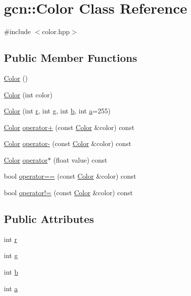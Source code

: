 \hypertarget{classgcn_1_1Color}{}\section{gcn\+:\+:Color Class Reference}
\label{classgcn_1_1Color}


{\ttfamily \#include $<$color.\+hpp$>$}

\subsection*{Public Member Functions}
\begin{DoxyCompactItemize}
\item 
\hyperlink{classgcn_1_1Color_a6dc73fa971bdb60c9e00ae4a69d33275}{Color} ()
\item 
\hyperlink{classgcn_1_1Color_a01d8582df017de59b0cf7c6585a4d345}{Color} (int color)
\item 
\hyperlink{classgcn_1_1Color_ac95423f560a25af45f7910c3e9d57837}{Color} (int \hyperlink{classgcn_1_1Color_a03c8b8fd862f837b5295b3ce28c94a33}{r}, int \hyperlink{classgcn_1_1Color_a13947bb1b79574cfb71580896a311a33}{g}, int \hyperlink{classgcn_1_1Color_a92f745d8f763ef16dcda11a03c44437f}{b}, int \hyperlink{classgcn_1_1Color_a46e7ab30d365efc4314368e01ffd6dbf}{a}=255)
\item 
\hyperlink{classgcn_1_1Color}{Color} \hyperlink{classgcn_1_1Color_a4414dab910cdf604db74fb49155136f7}{operator+} (const \hyperlink{classgcn_1_1Color}{Color} \&color) const 
\item 
\hyperlink{classgcn_1_1Color}{Color} \hyperlink{classgcn_1_1Color_a69b37321a4c87e8b3e0389a9abccfeff}{operator-\/} (const \hyperlink{classgcn_1_1Color}{Color} \&color) const 
\item 
\hyperlink{classgcn_1_1Color}{Color} \hyperlink{classgcn_1_1Color_a46103f408dfca5cf60b7f5b30a064139}{operator$\ast$} (float value) const 
\item 
bool \hyperlink{classgcn_1_1Color_aad86f1535915cf79442a9ed14c9f58ed}{operator==} (const \hyperlink{classgcn_1_1Color}{Color} \&color) const 
\item 
bool \hyperlink{classgcn_1_1Color_a0050e2fdab7df61d8c17e19cc2b9c4b3}{operator!=} (const \hyperlink{classgcn_1_1Color}{Color} \&color) const 
\end{DoxyCompactItemize}
\subsection*{Public Attributes}
\begin{DoxyCompactItemize}
\item 
int \hyperlink{classgcn_1_1Color_a03c8b8fd862f837b5295b3ce28c94a33}{r}
\item 
int \hyperlink{classgcn_1_1Color_a13947bb1b79574cfb71580896a311a33}{g}
\item 
int \hyperlink{classgcn_1_1Color_a92f745d8f763ef16dcda11a03c44437f}{b}
\item 
int \hyperlink{classgcn_1_1Color_a46e7ab30d365efc4314368e01ffd6dbf}{a}
\end{DoxyCompactItemize}


